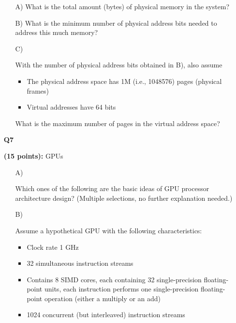 \documentclass[a4paper,10pt]{article}
\begin{document}
\begin{enumerate}
{    \begin{enumerate}
        \item[A)]{What is the total amount (bytes) of physical memory in the system?
        \vspace{5cm}}
        \item[B)]{What is the minimum number of physical address bits needed to address this much
memory?\vspace{5cm}}
        \item[C)]{With the number of physical address bits obtained in B), also assume
            \begin{itemize}
                \item The physical address space has 1M (i.e., 1048576) pages (physical frames)
                \item Virtual addresses have 64 bits
            \end{itemize}
            What is the maximum number of pages in the virtual address space?
        }
    \end{enumerate}
    \pagebreak
    }
    \item[\textbf{Q7}]{\textbf{(15 points):} GPUs
    
    \begin{enumerate}
        \item[A)]{
        Which ones of the following are the basic ideas of GPU processor architecture design? (Multiple selections, no further explanation needed.)
        }
        \item[B)]{
            Assume a hypothetical GPU with the following characteristics:
            
            \begin{itemize}
                \item Clock rate 1 GHz
                \item 32 simultaneous instruction streams
                \item Contains 8 SIMD cores, each containing 32 single-precision floating-point units, each instruction performs one single-precision floating-point operation (either a multiply or an add)
                \item 1024 concurrent (but interleaved) instruction streams
            \end{itemize}
            
}
\end{enumerate}}
\end{enumerate}
\end{document}
